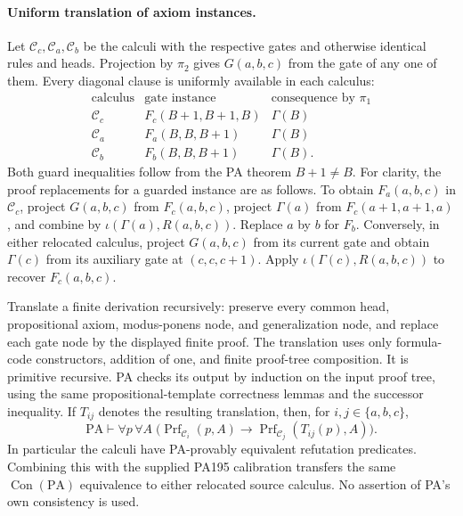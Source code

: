 \paragraph{Uniform translation of axiom instances.}
Let $\mathcal C_c,\mathcal C_a,\mathcal C_b$ be the calculi with the respective
gates and otherwise identical rules and heads.  Projection by $\pi_2$ gives
$G(a,b,c)$ from the gate of any one of them.  Every diagonal clause is
uniformly available in each calculus:
\[
 \begin{array}{c|c|c}
 \text{calculus}&\text{gate instance}&\text{consequence by }\pi_1\\\hline
 \mathcal C_c&F_c(B+1,B+1,B)&\Gamma(B)\\
 \mathcal C_a&F_a(B,B,B+1)&\Gamma(B)\\
 \mathcal C_b&F_b(B,B,B+1)&\Gamma(B).
 \end{array}
\]
Both guard inequalities follow from the PA theorem $B+1\ne B$.
For clarity, the proof replacements for a guarded instance are as follows.
To obtain $F_a(a,b,c)$ in $\mathcal C_c$, project $G(a,b,c)$ from
$F_c(a,b,c)$, project $\Gamma(a)$ from $F_c(a+1,a+1,a)$, and combine
by $\iota(\Gamma(a),R(a,b,c))$.  Replace $a$ by $b$ for $F_b$.
Conversely, in either relocated calculus, project $G(a,b,c)$ from its
current gate and obtain $\Gamma(c)$ from its auxiliary gate at
$(c,c,c+1)$.  Apply $\iota(\Gamma(c),R(a,b,c))$ to recover
$F_c(a,b,c)$.

Translate a finite derivation recursively: preserve every common head,
propositional axiom, modus-ponens node, and generalization node, and replace
each gate node by the displayed finite proof.  The translation uses only
formula-code constructors, addition of one, and finite proof-tree
composition.  It is primitive recursive.  PA checks its output by induction
on the input proof tree, using the same propositional-template correctness
lemmas and the successor inequality.  If $T_{ij}$ denotes the resulting
translation, then, for $i,j\in\{a,b,c\}$,
\[
 \mathrm{PA}\vdash\forall p\,\forall A\;
 \bigl(\operatorname{Prf}_{\mathcal C_i}(p,A)
       \longrightarrow
       \operatorname{Prf}_{\mathcal C_j}(T_{ij}(p),A)\bigr).
\]
In particular the calculi have PA-provably equivalent refutation
predicates.  Combining this with the supplied PA195 calibration transfers
the same $\operatorname{Con}(\mathrm{PA})$ equivalence to either relocated
source calculus.  No assertion of PA's own consistency is used.

